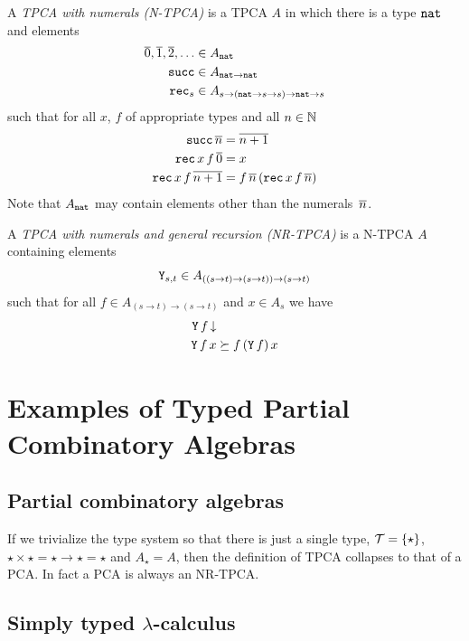 A \emph{TPCA with numerals (N-TPCA)} is a TPCA $A$ in which there is a
type $\mathtt{nat}$ and elements
%
\begin{align*}
  \overline{0}, \overline{1}, \overline{2}, \ldots &\in A_{\mathtt{nat}} \\
  \mathtt{succ} &\in A_{\mathtt{nat} \to \mathtt{nat}} \\
  \mathtt{rec}_s &\in A_{s \to (\mathtt{nat} \to s \to s) \to \mathtt{nat} \to s}
\end{align*}
%
such that for all $x$, $f$ of appropriate types and all $n \in \mathbb{N}$
%
\begin{align*}
  \mathtt{succ} \, \overline{n} &= \overline{n + 1} \\
  \mathtt{rec} \, x \, f \, \overline{0} &= x \\
  \mathtt{rec} \, x \, f \, \overline{n+1} &= f \, \overline{n} \,
     (\mathtt{rec} \, x \, f \, \overline{n})
\end{align*}
%
Note that $A_{\mathtt{nat}}$ may contain elements other than the
numerals~$\overline{n}$.

A \emph{TPCA with numerals and general recursion (NR-TPCA)} is a
N-TPCA $A$ containing elements
%
\begin{equation*}
  \mathtt{Y}_{s,t} \in A_{((s \to t) \to (s \to t)) \to (s \to t)}
\end{equation*}
%
such that for all $f \in A_{(s \to t) \to (s \to t)}$ and $x \in A_s$
we have
%
\begin{align*}
  \mathtt{Y} \, f\,{\downarrow} & \\
  \mathtt{Y} \, f \, x &\succeq f \, (\mathtt{Y}\, f) \, x
\end{align*}
%

\section{Examples of Typed Partial Combinatory Algebras}
\label{sec:examples-tpcas}

\subsection{Partial combinatory algebras}

If we trivialize the type system so that there is just a single type,
$\mathcal{T} = \{\star\}$, $\star \times \star = \star \to \star =
\star$ and $A_\star = A$, then the definition of TPCA collapses to
that of a PCA. In fact a PCA is always an NR-TPCA.


\subsection{Simply typed $\lambda$-calculus}

